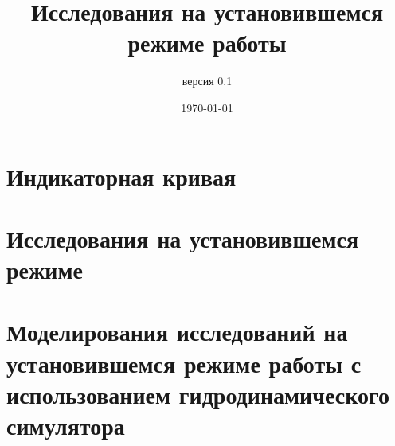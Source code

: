 \documentclass[oneside, openany]{memoir}
\author{версия 0.1}
\title{Исследования на установившемся режиме работы}
\date{\today}
\begin{document}
	
	\maketitle
	
	
	
	\chapter{Индикаторная кривая}
	
	
	
	
	\chapter{Исследования на установившемся режиме}
	
	
	\chapter{Моделирования исследований на установившемся режиме работы с использованием гидродинамического симулятора}
	
	
	
	
	
	
	\printbibliography
	
	
\end{document}
